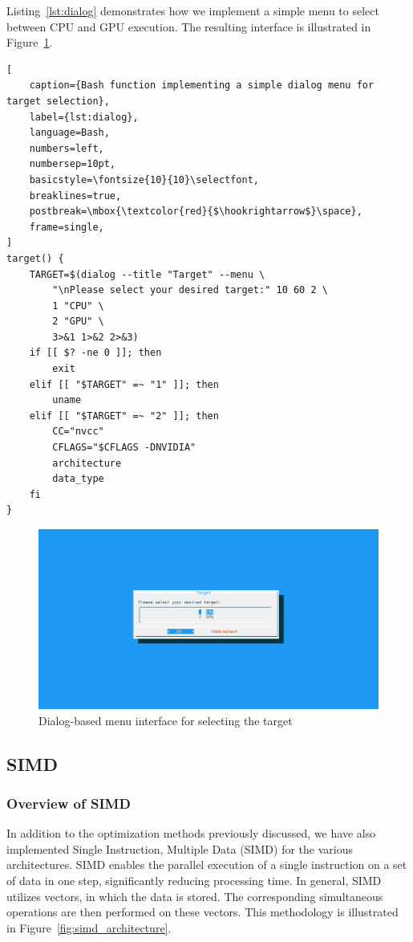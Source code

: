 \documentclass[modern,longauthor]{aastex7}
\begin{document}
Listing~\ref{lst:dialog} demonstrates how we implement a simple menu to select between CPU and GPU execution. The resulting interface is illustrated in Figure~\ref{fig:dialog}.
\begin{lstlisting}[
    caption={Bash function implementing a simple dialog menu for target selection},
    label={lst:dialog},
    language=Bash,
    numbers=left,
    numbersep=10pt,
    basicstyle=\fontsize{10}{10}\selectfont,
    breaklines=true,
    postbreak=\mbox{\textcolor{red}{$\hookrightarrow$}\space},
    frame=single,
]
target() {
    TARGET=$(dialog --title "Target" --menu \
        "\nPlease select your desired target:" 10 60 2 \
        1 "CPU" \
        2 "GPU" \
        3>&1 1>&2 2>&3)
    if [[ $? -ne 0 ]]; then
        exit
    elif [[ "$TARGET" =~ "1" ]]; then
        uname
    elif [[ "$TARGET" =~ "2" ]]; then
        CC="nvcc"
        CFLAGS="$CFLAGS -DNVIDIA"
        architecture
        data_type
    fi
}
\end{lstlisting}
\begin{figure}[htb!]
    \centering
    \includegraphics[width=\linewidth]{Dialog/Target.png}
    \caption{Dialog-based menu interface for selecting the target}
   \label{fig:dialog}
\end{figure}
\FloatBarrier
\subsection{SIMD}
\subsubsection{Overview of SIMD}\label{subsec:overview-of-simd}
In addition to the optimization methods previously discussed, we have also implemented Single Instruction, Multiple Data (SIMD) for the various architectures. SIMD enables the parallel execution of a single instruction on a set of data in one step, significantly reducing processing time. In general, SIMD utilizes vectors, in which the data is stored. The corresponding simultaneous operations are then performed on these vectors. This methodology is illustrated in Figure~\ref{fig:simd_architecture}.
\end{document}
